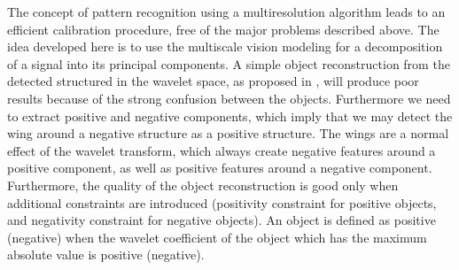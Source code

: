 The concept of pattern recognition 
using a multiresolution algorithm leads to an efficient calibration 
procedure, free of the major problems described above.    
The idea developed here is to use the multiscale vision modeling for 
a decomposition of a signal into its principal components. A simple 
object reconstruction from the detected structured in the wavelet 
space, as proposed in \cite{wave:bijaoui95}, will produce poor 
results because of the strong confusion between the objects. 
Furthermore
we need to extract positive and negative components, which imply that
 we may detect the wing around a negative structure as a positive
structure. The wings are a normal effect of the wavelet transform, 
which 
always create negative features around a positive component, as 
well as
positive features around a negative component. Furthermore,  
 the quality of the object reconstruction is good only when additional
 constraints are introduced (positivity constraint for positive 
objects, and
negativity constraint for negative objects). An object is defined as 
positive
(negative) when the wavelet coefficient of the object 
which has the maximum absolute value is positive (negative). 


